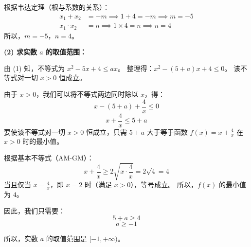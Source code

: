 \documentclass[UTF8]{article}
\begin{document}
	根据韦达定理（根与系数的关系）：
	\begin{align*}
		x_1 + x_2 &= -m \implies 1 + 4 = -m \implies m = -5 \\
		x_1 \cdot x_2 &= n \implies 1 \times 4 = n \implies n = 4
	\end{align*}
	所以，\(m = -5\)，\(n = 4\)。
	
	\vspace{0.5cm}
	\textbf{(2) 求实数 \(a\) 的取值范围：}
	
	由 (1) 知，不等式为 \(x^2 - 5x + 4 \le ax\)。
	整理得：\(x^2 - (5+a)x + 4 \le 0\)。
	该不等式对一切 \(x > 0\) 恒成立。
	
	由于 \(x > 0\)，我们可以将不等式两边同时除以 \(x\)，得：
	\[
	x - (5+a) + \frac{4}{x} \le 0
	\]
	\[
	x + \frac{4}{x} \le 5 + a
	\]
	要使该不等式对一切 \(x > 0\) 恒成立，只需 \(5+a\) 大于等于函数 \(f(x) = x + \frac{4}{x}\) 在 \(x > 0\) 时的最小值。
	
	根据基本不等式（AM-GM）：
	\[
	x + \frac{4}{x} \ge 2\sqrt{x \cdot \frac{4}{x}} = 2\sqrt{4} = 4
	\]
	当且仅当 \(x = \frac{4}{x}\)，即 \(x = 2\) 时（满足 \(x>0\)），等号成立。
	所以，\(f(x)\) 的最小值为 \(4\)。
	
	因此，我们只需要：
	\[
	5 + a \ge 4
	\]
	\[
	a \ge -1
	\]
	
	所以，实数 \(a\) 的取值范围是 \([-1, +\infty)\)。
	
\end{document}
